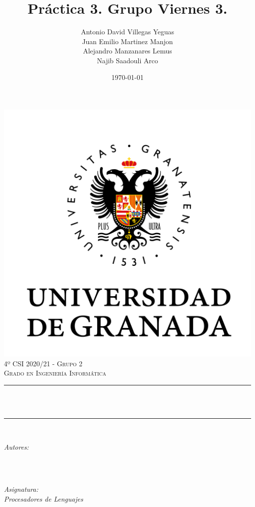 \documentclass[12pt, spanish]{article}
\title{Práctica 3. Grupo Viernes 3.\\
  \hspace{0.05cm} }
\author{Antonio David Villegas Yeguas\\
		Juan Emilio Martinez Manjon\\
		Alejandro Manzanares Lemus\\
		Najib Saadouli Arco}
\date{\today}
\makeatletter
\let\thetitle\@title
\let\theauthor\@author
\makeatother
\begin{document}

\begin{titlepage}
    \centering
    \vspace*{0.3 cm}
    \includegraphics[scale = 0.50]{ugr.png}\\[0.7 cm]
    \textsc{\large 4º CSI 2020/21 - Grupo 2}\\[0.5 cm]
    \textsc{\large Grado en Ingeniería Informática}\\[0.5 cm]
    \rule{\linewidth}{0.2 mm} \\[0.2 cm]
    { \huge \bfseries \thetitle}\\
    \rule{\linewidth}{0.2 mm} \\[1 cm]

    \begin{minipage}{0.4\textwidth}
        \begin{flushleft} \large
            \emph{Autores:}\\
            \theauthor\\
            \end{flushleft}
            \end{minipage}~
            \begin{minipage}{0.4\textwidth}
            \begin{flushright} \large
            \emph{Asignatura: \\
            Procesadores de Lenguajes}   \\


\end{flushright}
\end{minipage}
\end{titlepage}
\end{document}
